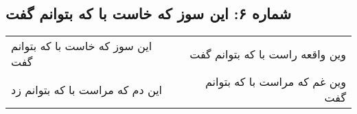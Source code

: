\begin{center}
\section*{شماره ۶: این سوز که خاست با که بتوانم گفت}
\label{sec:006}
\begin{longtable}{l p{0.5cm} r}
این سوز که خاست با که بتوانم گفت
&&
وین واقعه راست با که بتوانم گفت
\\
این دم که مراست با که بتوانم زد
&&
وین غم که مراست با که بتوانم گفت
\\
\end{longtable}
\end{center}
